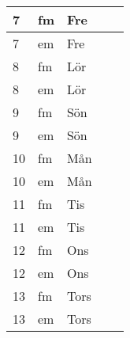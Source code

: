 \documentclass[a4paper]{article}
\begin{document}
\begin{table}[ht!]
\begin{tabular}{lllp{7cm}p{7cm}}
\multicolumn{1}{|l|}{7} & \multicolumn{1}{l|}{fm} & \multicolumn{1}{l|}{Fre} & \multicolumn{1}{l|}{} & \multicolumn{1}{l|}{} \\ \hline
\multicolumn{1}{|l|}{7} & \multicolumn{1}{l|}{em} & \multicolumn{1}{l|}{Fre} & \multicolumn{1}{l|}{} & \multicolumn{1}{l|}{} \\ \hline    

\multicolumn{1}{|l|}{8} & \multicolumn{1}{l|}{fm} & \multicolumn{1}{l|}{Lör} & \multicolumn{1}{l|}{} & \multicolumn{1}{l|}{} \\ \hline
\multicolumn{1}{|l|}{8} & \multicolumn{1}{l|}{em} & \multicolumn{1}{l|}{Lör} & \multicolumn{1}{l|}{} & \multicolumn{1}{l|}{} \\ \hline    

\multicolumn{1}{|l|}{9} & \multicolumn{1}{l|}{fm} & \multicolumn{1}{l|}{Sön} & \multicolumn{1}{l|}{} & \multicolumn{1}{l|}{} \\ \hline
\multicolumn{1}{|l|}{9} & \multicolumn{1}{l|}{em} & \multicolumn{1}{l|}{Sön} & \multicolumn{1}{l|}{} & \multicolumn{1}{l|}{} \\ \hline    

\multicolumn{1}{|l|}{10} & \multicolumn{1}{l|}{fm} & \multicolumn{1}{l|}{Mån} & \multicolumn{1}{l|}{} & \multicolumn{1}{l|}{} \\ \hline
\multicolumn{1}{|l|}{10} & \multicolumn{1}{l|}{em} & \multicolumn{1}{l|}{Mån} & \multicolumn{1}{l|}{} & \multicolumn{1}{l|}{} \\ \hline    

\multicolumn{1}{|l|}{11} & \multicolumn{1}{l|}{fm} & \multicolumn{1}{l|}{Tis} & \multicolumn{1}{l|}{} & \multicolumn{1}{l|}{} \\ \hline
\multicolumn{1}{|l|}{11} & \multicolumn{1}{l|}{em} & \multicolumn{1}{l|}{Tis} & \multicolumn{1}{l|}{} & \multicolumn{1}{l|}{} \\ \hline    

\multicolumn{1}{|l|}{12} & \multicolumn{1}{l|}{fm} & \multicolumn{1}{l|}{Ons} & \multicolumn{1}{l|}{} & \multicolumn{1}{l|}{} \\ \hline
\multicolumn{1}{|l|}{12} & \multicolumn{1}{l|}{em} & \multicolumn{1}{l|}{Ons} & \multicolumn{1}{l|}{} & \multicolumn{1}{l|}{} \\ \hline    

\multicolumn{1}{|l|}{13} & \multicolumn{1}{l|}{fm} & \multicolumn{1}{l|}{Tors} & \multicolumn{1}{l|}{} & \multicolumn{1}{l|}{} \\ \hline
\multicolumn{1}{|l|}{13} & \multicolumn{1}{l|}{em} & \multicolumn{1}{l|}{Tors} & \multicolumn{1}{l|}{} & \multicolumn{1}{l|}{} \\ \hline    


\end{tabular}
\end{table}
\end{document}

